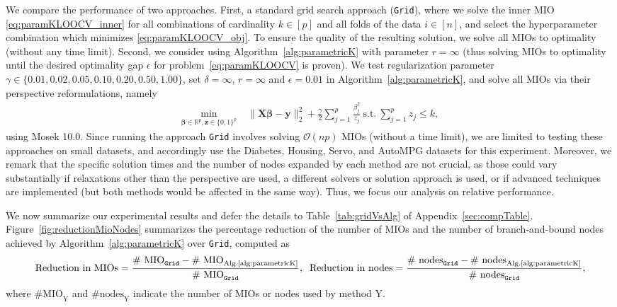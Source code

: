 \documentclass[opre,nonblindrev]{informs3} %
\begin{document}
We compare the performance of two approaches. First, a standard grid search approach (\texttt{Grid}), where we solve the inner MIO \eqref{eq:paramKLOOCV_inner} for all combinations of cardinality $k\in [p]$ and all folds of the data $i\in [n]$, and select the hyperparameter combination which minimizes \eqref{eq:paramKLOOCV_obj}. To ensure the quality of the resulting solution, we solve all MIOs to optimality (without any time limit). Second, we consider using Algorithm~\ref{alg:parametricK} with parameter $r=\infty$ (thus solving MIOs to optimality until the desired optimality gap $\epsilon$ for problem~\eqref{eq:paramKLOOCV} is proven). We test regularization parameter $\gamma\in \{0.01,0.02,0.05,0.10,0.20,0.50,1.00\}$, set $\delta=\infty$, $r=\infty$ and $\epsilon=0.01$ in Algorithm~\ref{alg:parametricK}, and solve all MIOs via their perspective reformulations, namely
\begin{align*}
	\min_{\bm{\beta}\in \mathbb{R}^p,\bm{z}\in \{0,1\}^p}\;& \|\bm{X}\bm{\beta}-\bm{y}\|_2^2+\frac{\gamma}{2}\sum_{j=1}^p \frac{\beta_j^2}{z_j}\ \text{s.t.}\ \sum_{j=1}^p z_j\leq k,
\end{align*} 
using Mosek 10.0. Since running the approach \texttt{Grid} involves solving $\mathcal{O}(np)$ MIOs (without a time limit), we are limited to testing these approaches on small datasets, and accordingly use the Diabetes, Housing, Servo, and AutoMPG datasets for this experiment. Moreover, we remark that the specific solution times and the number of nodes expanded by each method are not crucial, as those could vary substantially if relaxations other than the perspective are used, a different solvers or solution approach is used, or if advanced techniques are implemented (but both methods would be affected in the same way). Thus, we focus our analysis on relative performance.

We now summarize our experimental results and defer the details to Table~\ref{tab:gridVsAlg} of Appendix~\ref{sec:compTable}. Figure~\ref{fig:reductionMioNodes} summarizes the percentage reduction of the number of MIOs and the number of branch-and-bound nodes achieved by Algorithm~\ref{alg:parametricK} over \texttt{Grid}, computed as 
\small$$ \text{Reduction in MIOs}=\frac{\text{\# MIO}_{\texttt{Grid}}-\text{\# MIO}_{\text{Alg.\ref{alg:parametricK}}}}{\text{\# MIO}_{\texttt{Grid}}},\;\; \text{Reduction in nodes}=\frac{\text{\# nodes}_{\texttt{Grid}}-\text{\# nodes}_{\text{Alg.\ref{alg:parametricK}}}}{\text{\# nodes}_{\texttt{Grid}}},$$\normalsize
where $\text{\# MIO}_{\text{Y}}$ and $\text{\# nodes}_{\text{Y}}$ indicate the number of MIOs or nodes used by method Y.  
\end{document}
